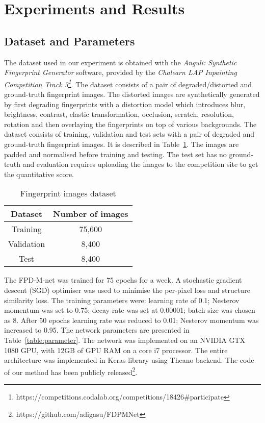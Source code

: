 \documentclass{llncs}
\begin{document}
\section{Experiments and Results}
\vspace{-0.2cm}
\subsection{Dataset and Parameters}
\label{ssec:dataset}
\vspace{-0.2cm}
The dataset used in our experiment is obtained with the \textit{Anguli: Synthetic Fingerprint Generator} software, provided by the \textit{Chalearn LAP Inpainting Competition Track 3\footnote{https://competitions.codalab.org/competitions/18426\#participate}}. The dataset consists of a pair of degraded/distorted and ground-truth fingerprint images. The distorted images are synthetically generated by first degrading fingerprints with a distortion model which introduces blur, brightness, contrast, elastic transformation, occlusion, scratch, resolution, rotation and then overlaying the fingerprints on top of various backgrounds. The dataset consists of training, validation and test sets with a pair of degraded and ground-truth fingerprint images. It is described in Table~\ref{table:dataset}. The images are padded and normalised before training and testing. The test set has no ground-truth and evaluation requires uploading the images to the competition site to get the quantitative score.

\begin{table}[h!]
\centering
\addtolength{\tabcolsep}{20pt}
\begin{tabular}{ c | c}
    \hline \hline
    Dataset      & Number of images \\ [0.5ex] \hline \hline
    Training     & 75,600           \\ 
    Validation   & 8,400            \\ 
    Test         & 8,400            \\ [0.3ex] \hline \hline
\end{tabular}
\caption{Fingerprint images dataset}
\label{table:dataset}
\end{table}

The FPD-M-net was trained for 75 epochs for a week. A stochastic gradient descent (SGD) optimiser was used to minimise the per-pixel loss and structure similarity loss. The training parameters were: learning rate of 0.1; Nesterov momentum was set to 0.75; decay rate was set at 0.00001; batch size was chosen as 8. After 50 epochs learning rate was reduced to 0.01; Nesterov momentum was increased to 0.95. The network parameters are presented in Table~\ref{table:parameter}. The network was implemented on an NVIDIA GTX 1080 GPU, with 12GB of GPU RAM on a core i7 processor. The entire architecture was implemented in Keras library using Theano backend. The code of our method has been publicly released\footnote{https://github.com/adigasu/FDPMNet}.
\end{document}

